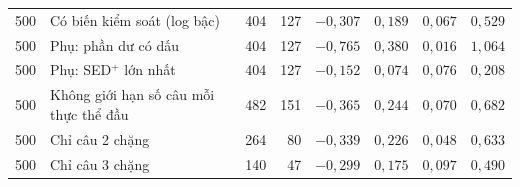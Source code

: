 \begin{tabular}{rlrrrrrr}
500 & Có biến kiểm soát (log bậc) & 404 & 127 & $-0{,}307$ & $0{,}189$ & $0{,}067$ & $0{,}529$ \\
500 & Phụ: phần dư có dấu & 404 & 127 & $-0{,}765$ & $0{,}380$ & $0{,}016$ & $1{,}064$ \\
500 & Phụ: SED$^+$ lớn nhất & 404 & 127 & $-0{,}152$ & $0{,}074$ & $0{,}076$ & $0{,}208$ \\
500 & Không giới hạn số câu mỗi thực thể đầu & 482 & 151 & $-0{,}365$ & $0{,}244$ & $0{,}070$ & $0{,}682$ \\
500 & Chỉ câu 2 chặng & 264 & 80 & $-0{,}339$ & $0{,}226$ & $0{,}048$ & $0{,}633$ \\
500 & Chỉ câu 3 chặng & 140 & 47 & $-0{,}299$ & $0{,}175$ & $0{,}097$ & $0{,}490$ \\
\bottomrule
\end{tabular}
